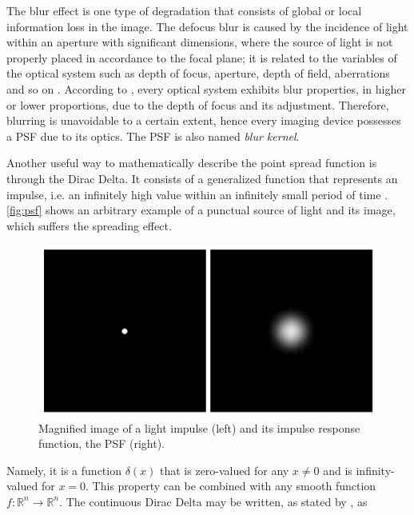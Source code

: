 The blur effect is one type of degradation that consists of global or local information loss in the image. The defocus blur is caused by the incidence of light within an aperture with significant dimensions, where the source of light is not properly placed in accordance to the focal plane; it is related to the variables of the optical system such as depth of focus, aperture, depth of field, aberrations and so on \cite{joshi2014defocus}. According to , every optical system exhibits blur properties, in higher or lower proportions, due to the depth of focus and its adjustment. Therefore, blurring is unavoidable to a certain extent, hence every imaging device possesses a PSF due to its optics. The PSF is also named \emph{blur kernel}.

Another useful way to mathematically describe the point spread function is through the Dirac Delta. It consists of a generalized function that represents an impulse, i.e. an infinitely high value within an infinitely small period of time \cite{bracewell2000fourier}. \autoref{fig:psf} shows an arbitrary example of a punctual source of light and its image, which suffers the spreading effect.

\begin{figure}[H]
	\centering
	\caption{\label{fig:psf} Magnified image of a light impulse (left) and its impulse response function, the PSF (right).}
	\begin{center}
	    \includegraphics[scale=0.4]{images/fig8.png}
	\end{center}
	\centering
\end{figure}

Namely, it is a function $\delta(x)$ that is zero-valued for any $x \neq 0$ and is infinity-valued for $x = 0$. This property can be combined with any smooth function $f\colon \mathbb{R}^{n} \to \mathbb{R}^{n}$.
The continuous Dirac Delta may be written, as stated by , as

